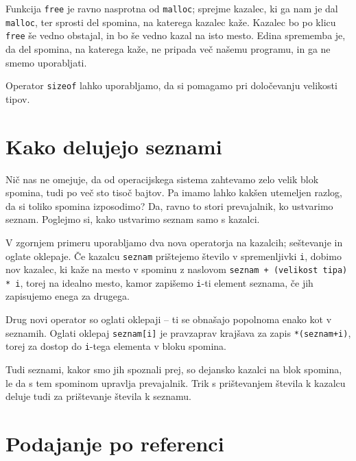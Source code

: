 \documentclass{book}
\begin{document}
Funkcija \verb+free+ je ravno nasprotna od \verb+malloc+; sprejme kazalec, ki ga
nam je dal \verb+malloc+, ter sprosti del spomina, na katerega kazalec kaže.
Kazalec bo po klicu \verb+free+ še vedno obstajal, in bo še vedno kazal na isto
mesto. Edina sprememba je, da del spomina, na katerega kaže, ne pripada več
našemu programu, in ga ne smemo uporabljati.

\begin{examples}
  Operator \verb+sizeof+ lahko uporabljamo, da si pomagamo pri določevanju
  velikosti tipov.
\end{examples}

\newpage
\section{Kako delujejo seznami}

Nič nas ne omejuje, da od operacijskega sistema zahtevamo zelo velik blok
spomina, tudi po več sto tisoč bajtov. Pa imamo lahko kakšen utemeljen razlog,
da si toliko spomina izposodimo? Da, ravno to stori prevajalnik, ko ustvarimo
seznam. Poglejmo si, kako ustvarimo seznam samo s kazalci.

\begin{examples}
\end{examples}

V zgornjem primeru uporabljamo dva nova operatorja na kazalcih; seštevanje in
oglate oklepaje. Če kazalcu \verb+seznam+ prištejemo število v spremenljivki
\verb+i+, dobimo nov kazalec, ki kaže na mesto v spominu z naslovom
\verb|seznam + (velikost tipa) * i|, torej na
idealno mesto, kamor zapišemo \verb+i+-ti element seznama, če jih zapisujemo
enega za drugega.

Drug novi operator so oglati oklepaji -- ti se obnašajo popolnoma enako kot
v seznamih. Oglati oklepaj \verb+seznam[i]+ je pravzaprav krajšava za zapis
\verb|*(seznam+i)|, torej za dostop do \verb+i+-tega elementa v bloku spomina.

Tudi seznami, kakor smo jih spoznali prej, so dejansko kazalci na blok spomina,
le da s tem spominom upravlja prevajalnik. Trik s prištevanjem števila k
kazalcu deluje tudi za prištevanje števila k seznamu.

\section{Podajanje po referenci}
\end{document}
